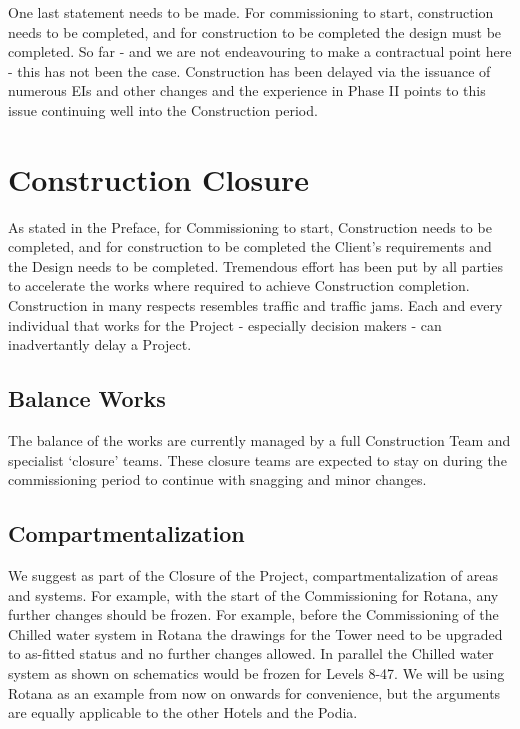 One last statement needs to be made. For commissioning to start, construction needs to be completed, and for construction to be completed the design must be completed. So far - and we are not endeavouring to make a contractual point here - this has not been the case. Construction has been delayed via the issuance of numerous EIs and other changes and the experience in Phase II points to this issue continuing well into the Construction period. 

 

\chapter{Construction Closure}

As stated in the Preface, for Commissioning to start, Construction needs to be completed, and for construction to be completed the Client's requirements and the Design needs to be completed. Tremendous effort has been put by all parties to accelerate the works where required to achieve Construction completion. Construction in many respects resembles traffic and traffic jams. Each and every individual that works for the Project - especially decision makers - can inadvertantly delay a Project. 

\section{Balance Works}

The balance of the works are currently managed by a full Construction Team and specialist `closure' teams. These closure teams are expected to stay on during the commissioning period to continue with snagging and minor changes.


\section*{Compartmentalization}

We suggest as part of the Closure of the Project, compartmentalization of areas and systems. For example, with the start of the Commissioning for Rotana, any further changes should be frozen. For example, before the Commissioning of the Chilled water system in Rotana the drawings for the Tower need to be upgraded to as-fitted status and no further changes allowed. In parallel the Chilled water system as shown on schematics would be frozen for Levels 8-47. We will be using Rotana as an example from now on onwards for convenience, but the arguments are equally applicable to the other Hotels and the Podia.

